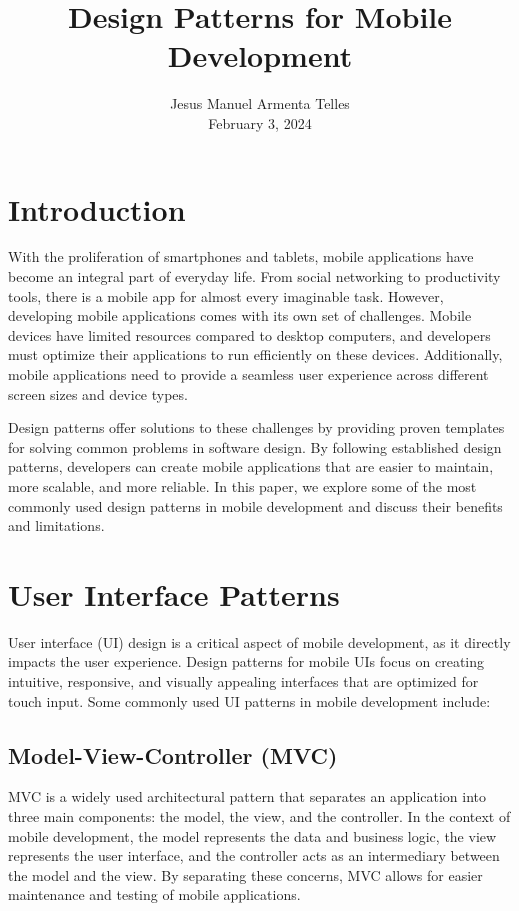 \documentclass[journal]{IEEEtran}
\title{Design Patterns for Mobile Development}
\author{Jesus Manuel Armenta Telles  \\ \large February 3, 2024}
\begin{document}
	
	\maketitle
	
	
	\section{Introduction}
	With the proliferation of smartphones and tablets, mobile applications have become an integral part of everyday life. From social networking to productivity tools, there is a mobile app for almost every imaginable task. However, developing mobile applications comes with its own set of challenges. Mobile devices have limited resources compared to desktop computers, and developers must optimize their applications to run efficiently on these devices. Additionally, mobile applications need to provide a seamless user experience across different screen sizes and device types.
	
	Design patterns offer solutions to these challenges by providing proven templates for solving common problems in software design. By following established design patterns, developers can create mobile applications that are easier to maintain, more scalable, and more reliable. In this paper, we explore some of the most commonly used design patterns in mobile development and discuss their benefits and limitations.
	
	\section{User Interface Patterns}
	User interface (UI) design is a critical aspect of mobile development, as it directly impacts the user experience. Design patterns for mobile UIs focus on creating intuitive, responsive, and visually appealing interfaces that are optimized for touch input. Some commonly used UI patterns in mobile development include:
	
	\subsection{Model-View-Controller (MVC)}
	MVC is a widely used architectural pattern that separates an application into three main components: the model, the view, and the controller. In the context of mobile development, the model represents the data and business logic, the view represents the user interface, and the controller acts as an intermediary between the model and the view. By separating these concerns, MVC allows for easier maintenance and testing of mobile applications.
	
\end{document}
